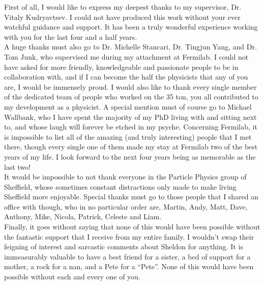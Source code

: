 
\begin{acknowledgements}      

  First of all, I would like to express my deepest thanks to my supervisor, Dr. Vitaly Kudryavtsev. I could not have produced this work without your ever watchful guidance and support. It has been a truly wonderful experience working with you for the last four and a half years. \\
  
  A huge thanks must also go to Dr. Michelle Stancari, Dr. Tingjun Yang, and Dr. Tom Junk, who supervised me during my attachment at Fermilab. I could not have asked for more friendly, knowledgeable and passionate people to be in collaboration with, and if I can become the half the physicists that any of you are, I would be immensely proud. I would also like to thank every single member of the dedicated team of people who worked on the 35 ton, you all contributed to my development as a physicist. A special mention must of course go to Michael Wallbank, who I have spent the majority of my PhD living with and sitting next to, and whose laugh will forever be etched in my psyche. Concerning Fermilab, it is impossible to list all of the amazing (and truly interesting) people that I met there, though every single one of them made my stay at Fermilab two of the best years of my life. I look forward to the next four years being as memorable as the last two! \\

  It would be impossible to not thank everyone in the Particle Physics group of Sheffield, whose sometimes constant distractions only made to make living Sheffield more enjoyable. Special thanks must go to those people that I shared an office with though, who in no particular order are, Martin, Andy, Matt, Dave, Anthony, Mike, Nicola, Patrick, Celeste and Liam. \\

  Finally, it goes without saying that none of this would have been possible without the fantastic support that I receive from my entire family. I wouldn't swap their feigning of interest and sarcastic comments about Sheldon for anything. It is immeasurably valuable to have a best friend for a sister, a bed of support for a mother, a rock for a nan, and a Pete for a ``Pete''. None of this would have been possible without each and every one of you. \\

\end{acknowledgements}
